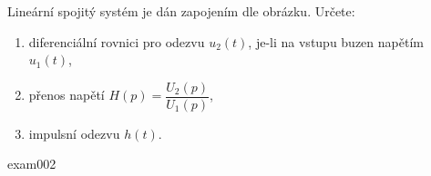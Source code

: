 \begin{tkyexam}{Lineární spojitý systém je dán zapojením dle obrázku. Určete:
  \begin{enumerate}[leftmargin=12pt,noitemsep]
    \item diferenciální rovnici pro odezvu $u_2(t)$, je-li na vstupu buzen napětím $u_1(t)$,
    \item přenos napětí $H(p)=\dfrac{U_2(p)}{U_1(p)}$,
    \item impulsní odezvu $h(t)$.
  \end{enumerate}
  }{exam002}

  {\centering
   \captionsetup{type=figure}
   \label{tky:fig008}
  \par}


\end{tkyexam}
